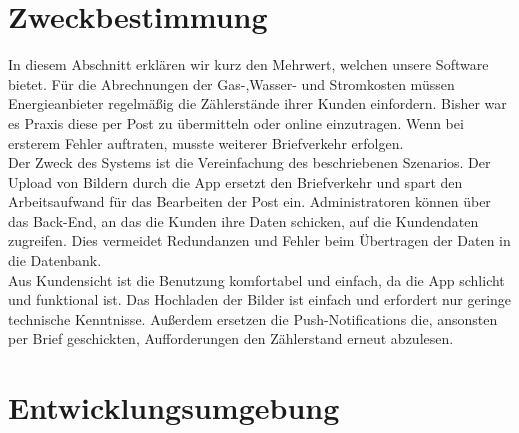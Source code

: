 \section{Zweckbestimmung}\label{sec:zweckbestimmung}
In diesem Abschnitt erklären wir kurz den Mehrwert, welchen unsere Software bietet. 
Für die Abrechnungen der Gas-,Wasser- und Stromkosten müssen Energieanbieter regelmäßig die Zählerstände ihrer
Kunden einfordern. Bisher war es Praxis diese per Post zu übermitteln oder online einzutragen. Wenn bei ersterem Fehler auftraten, musste weiterer Briefverkehr erfolgen.\\
Der Zweck des Systems ist die Vereinfachung des beschriebenen Szenarios. Der Upload von Bildern durch die App ersetzt den Briefverkehr und spart den Arbeitsaufwand für das Bearbeiten der Post ein. Administratoren können über das Back-End, an das die Kunden ihre Daten schicken, auf die Kundendaten zugreifen. Dies vermeidet Redundanzen und Fehler beim Übertragen der Daten in die Datenbank.\\
Aus Kundensicht ist die Benutzung komfortabel und einfach, da die App schlicht und funktional ist. Das Hochladen der Bilder ist einfach und erfordert nur geringe technische Kenntnisse. Außerdem ersetzen die Push-Notifications die, ansonsten per Brief geschickten, Aufforderungen den Zählerstand erneut abzulesen.



\section{Entwicklungsumgebung}\label{sec:entwicklungsumgebung}

